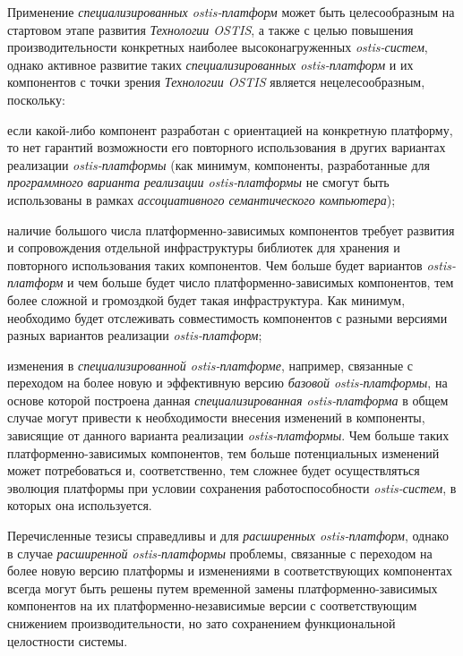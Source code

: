 Применение \textit{специализированных ostis-платформ} может быть целесообразным на стартовом этапе развития \textit{Технологии OSTIS}, а также с целью повышения производительности конкретных наиболее высоконагруженных \textit{ostis-систем}, однако активное развитие таких \textit{специализированных ostis-платформ} и их компонентов с точки зрения \textit{Технологии OSTIS} является нецелесообразным, поскольку:
\begin{textitemize}
	\item если какой-либо компонент разработан с ориентацией на конкретную платформу, то нет гарантий возможности его повторного использования в других вариантах реализации \textit{ostis-платформы} (как минимум, компоненты, разработанные для \textit{программного варианта реализации ostis-платформы} не смогут быть использованы в рамках \textit{ассоциативного семантического компьютера});
	\item наличие большого числа платформенно-зависимых компонентов требует развития и сопровождения отдельной инфраструктуры библиотек для хранения и повторного использования таких компонентов. Чем больше будет вариантов \textit{ostis-платформ} и чем больше будет число платформенно-зависимых компонентов, тем более сложной и громоздкой будет такая инфраструктура. Как минимум, необходимо будет отслеживать совместимость компонентов с разными версиями разных вариантов реализации \textit{ostis-платформ};
	\item изменения в \textit{специализированной ostis-платформе}, например, связанные с переходом на более новую и эффективную версию \textit{базовой ostis-платформы}, на основе которой построена данная \textit{специализированная ostis-платформа} в общем случае могут привести к необходимости внесения изменений в компоненты, зависящие от данного варианта реализации \textit{ostis-платформы}. Чем больше таких платформенно-зависимых компонентов, тем больше потенциальных изменений может потребоваться и, соответственно, тем сложнее будет осуществляться эволюция платформы при условии сохранения работоспособности \textit{ostis-систем}, в которых она используется.
\end{textitemize} 

Перечисленные тезисы справедливы и для \textit{расширенных ostis-платформ}, однако в случае \textit{расширенной ostis-платформы} проблемы, связанные с переходом на более новую версию платформы и изменениями в соответствующих компонентах всегда могут быть решены путем временной замены платформенно-зависимых компонентов на их платформенно-независимые версии с соответствующим снижением производительности, но зато сохранением функциональной целостности системы.

